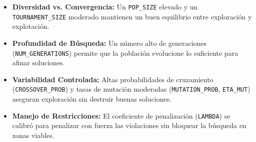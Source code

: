 \begin{itemize}
  \item \textbf{Diversidad vs. Convergencia:} Un \texttt{POP\_SIZE} elevado y un \texttt{TOURNAMENT\_SIZE} moderado mantienen un buen equilibrio entre exploración y explotación.
  \item \textbf{Profundidad de Búsqueda:} Un número alto de generaciones (\texttt{NUM\_GENERATIONS}) permite que la población evolucione lo suficiente para afinar soluciones.
  \item \textbf{Variabilidad Controlada:} Altas probabilidades de cruzamiento (\texttt{CROSSOVER\_PROB}) y tasas de mutación moderadas (\texttt{MUTATION\_PROB}, \texttt{ETA\_MUT}) aseguran exploración sin destruir buenas soluciones.
  \item \textbf{Manejo de Restricciones:} El coeficiente de penalización (\texttt{LAMBDA}) se calibró para penalizar con fuerza las violaciones sin bloquear la búsqueda en zonas viables.
\end{itemize}
